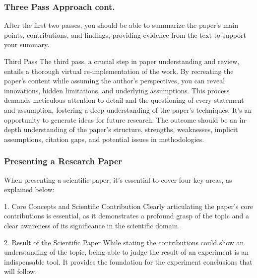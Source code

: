 \documentclass[11pt,xcolor={dvipsnames},hyperref={pdftex,pdfpagemode=UseNone,hidelinks,pdfdisplaydoctitle=true},usepdftitle=false]{beamer}
\begin{document}
\begin{frame}
	\frametitle{Three Pass Approach cont.}
	After the first two passes, you should be able to summarize the paper's main points, contributions, and findings, providing evidence from the text to support your summary.
	\begin{block}{Third Pass}
		The third pass, a crucial step in paper understanding and review, entails a thorough virtual re-implementation of the work. By recreating the paper's content while assuming the author's perspectives, you can reveal innovations, hidden limitations, and underlying assumptions. This process demands meticulous attention to detail and the questioning of every statement and assumption, fostering a deep understanding of the paper's techniques. It's an opportunity to generate ideas for future research. The outcome should be an in-depth understanding of the paper's structure, strengths, weaknesses, implicit assumptions, citation gaps, and potential issues in methodologies.
	\end{block}
\end{frame}


\begin{frame}
\end{frame}

\begin{frame}
	\frametitle{Presenting a Research Paper}
	When presenting a scientific paper, it's essential to cover four key areas, as explained below:
	
	\begin{block}{1. Core Concepts and Scientific Contribution}
		Clearly articulating the paper's core contributions is essential, as it demonstrates a profound grasp of the topic and a clear awareness of its significance in the scientific domain.
	\end{block}
	
	\begin{block}{2. Result of the Scientific Paper}
		While stating the contributions could show an understanding of the topic, being able to judge the result of an experiment is an indispensable tool. It provides the foundation for the experiment conclusions that will follow.
	\end{block}
\end{frame}
\end{document}
